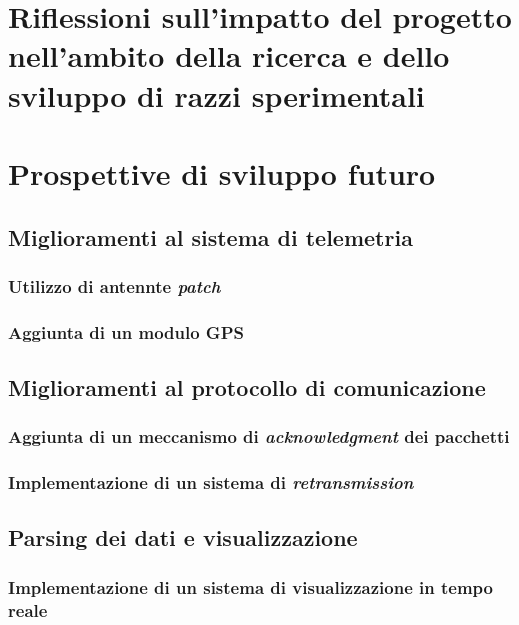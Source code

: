 \documentclass[12pt,a4paper,twoside]{book}
\begin{document}
\section{Riflessioni sull'impatto del progetto nell'ambito della ricerca e dello sviluppo di razzi sperimentali}

\section{Prospettive di sviluppo futuro}
\subsection{Miglioramenti al sistema di telemetria}
\subsubsection{Utilizzo di antennte \emph{patch}}
\subsubsection{Aggiunta di un modulo GPS}

\subsection{Miglioramenti al protocollo di comunicazione}
\subsubsection{Aggiunta di un meccanismo di \emph{acknowledgment} dei pacchetti}
\subsubsection{Implementazione di un sistema di \emph{retransmission}}

\subsection{Parsing dei dati e visualizzazione}
\subsubsection{Implementazione di un sistema di visualizzazione in tempo reale}
\end{document}
